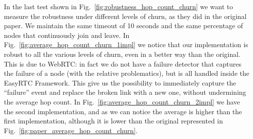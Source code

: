 \newpage
In the last test shown in Fig.~\ref{fig:robustness_hop_count_churn} we want to measure the robustness under different levels of churn, as they did in the original paper. We maintain the same timeout of 10 seconds and the same percentage of nodes that continuously join and leave. In Fig.~\ref{fig:average_hop_count_churn_1impl} we notice that our implementation is robust to all the various levels of churn, even in a better way than the original. This is due to WebRTC: in fact we do not have a failure detector that captures the failure of a node (with the relative problematics), but is all handled inside the EasyRTC Framework. This give us the possibility to immediately capture the ``failure'' event and replace the broken link with a new one, without undermining the average hop count. In Fig.~\ref{fig:average_hop_count_churn_2impl} we have the second implementation, and as we can notice the average is higher than the first implementation, although it is lower than the original represented in Fig.~\ref{fig:paper_average_hop_count_churn}.


